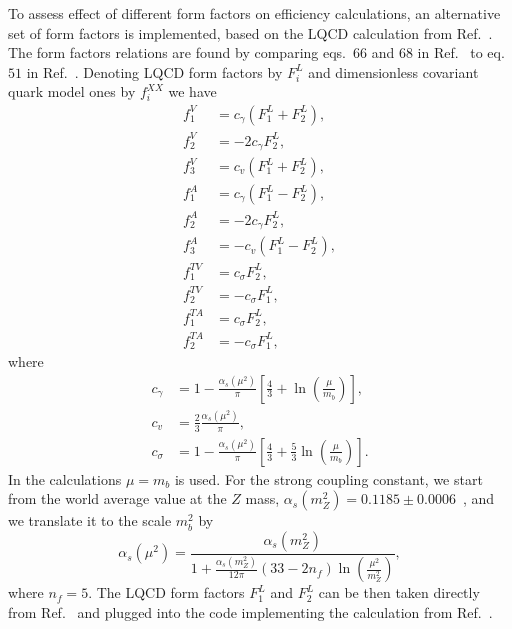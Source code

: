 To assess effect of different form factors on efficiency calculations, an alternative set of form 
factors is implemented, based on the LQCD calculation from Ref.~\cite{Detmold:2012vy}.
The form factors relations are found by comparing eqs.~66 and $68$ in Ref.~\cite{Gutsche:2013pp} to eq.~$51$ in
Ref.~\cite{Detmold:2012vy}. Denoting LQCD form factors by $F_i^L$ and dimensionless covariant quark model ones by
$f_i^{XX}$ we have
\begin{align}
  f_1^V&=c_\gamma(F_1^L+F_2^L), \nonumber \\
  f_2^V&=-2c_\gamma F_2^L, \nonumber \\
  f_3^V&=c_v(F_1^L+F_2^L), \nonumber \\
  f_1^A&=c_\gamma(F_1^L-F_2^L), \nonumber \\
  f_2^A&=-2c_\gamma F_2^L, \nonumber \\
  f_3^A&=-c_v(F_1^L-F_2^L), \nonumber \\
  f_1^{TV}&=c_\sigma F_2^L, \nonumber \\
  f_2^{TV}&=-c_\sigma F_1^L, \nonumber \\
  f_1^{TA}&=c_\sigma F_2^L, \nonumber \\
  f_2^{TA}&=-c_\sigma F_1^L, \nonumber 
\end{align} 
where
\begin{align}
c_\gamma&=1-\frac{\alpha_s(\mu^2)}{\pi}\left[\frac{4}{3}+\ln\left(\frac{\mu}{m_b}\right)\right],\nonumber \\
c_v&=\frac{2}{3}\frac{\alpha_s(\mu^2)}{\pi}, \nonumber \\
c_\sigma&=1-\frac{\alpha_s(\mu^2)}{\pi}\left[\frac{4}{3}+\frac{5}{3}\ln\left(\frac{\mu}{m_b}\right)\right].
\end{align}
In the calculations $\mu=m_b$ is used. For the strong coupling constant, we start from the world average value at
the $Z$ mass, $\alpha_s(m_Z^2)=0.1185 \pm 0.0006$~\cite{PDG2014}, and we translate it to the scale $m_b^2$ by
\begin{equation}
\alpha_s(\mu^2)=\frac{\alpha_s(m_Z^2)}{1+\frac{\alpha_s(m_Z^2)}{12\pi}
\left(33-2n_f\right)\ln\left(\frac{\mu^2}{m_Z^2}\right)},
\end{equation}
where $n_f=5$. The LQCD form factors $F_1^L$ and $F_2^L$ can be then taken directly from Ref.~\cite{Detmold:2012vy} and
plugged into the code implementing the calculation from Ref.~\cite{Gutsche:2013pp}.

